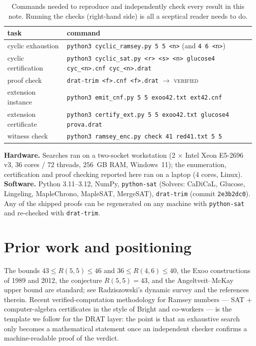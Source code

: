 \documentclass[11pt]{article}
\theoremstyle{definition}
\theoremstyle{plain}
\newcommand{\R}[2]{\ensuremath{R(#1,#2)}}
\begin{document}
\begin{table}[ht]
\centering\small
\begin{tabular}{ll}
\toprule
task & command \\
\midrule
cyclic exhaustion & \texttt{python3 cyclic\_ramsey.py 5 5 <n>} (and \texttt{4 6 <n>}) \\
cyclic certification & \texttt{python3 cyclic\_sat.py <r> <s> <n> glucose4 cyc\_<n>.cnf cyc\_<n>.drat} \\
proof check & \texttt{drat-trim <f>.cnf <f>.drat}  $\to$ \textsc{verified} \\
extension instance & \texttt{python3 emit\_cnf.py 5 5 exoo42.txt ext42.cnf} \\
extension certificate & \texttt{python3 certify\_ext.py 5 5 exoo42.txt glucose4 prova.drat} \\
witness check & \texttt{python3 ramsey\_enc.py check 41 red41.txt 5 5} \\
\bottomrule
\end{tabular}
\caption{Commands needed to reproduce and independently check every result in
this note. Running the checks (right-hand side) is all a sceptical reader
needs to do.}
\label{tab:cmd}
\end{table}

\textbf{Hardware.} Searches ran on a two-socket workstation (2 $\times$ Intel
Xeon E5-2696 v3, $36$ cores / $72$ threads, $256$~GB RAM, Windows~11); the
enumeration, certification and proof checking reported here ran on a laptop
(4 cores, Linux). \textbf{Software.} Python 3.11--3.12, NumPy, \texttt{python-sat}
(Solvers: CaDiCaL, Glucose, Lingeling, MapleChrono, MapleSAT, MergeSAT),
\texttt{drat-trim} (commit \texttt{2e3b2dc0}). Any of the shipped proofs can be
regenerated on any machine with \texttt{python-sat} and re-checked with
\texttt{drat-trim}.

\section{Prior work and positioning}\label{sec:prior}

The bounds $43 \le \R{5}{5} \le 46$ and $36 \le \R{4}{6} \le 40$, the Exoo
constructions of 1989 and 2012, the conjecture $\R{5}{5} = 43$, and the
Angeltveit--McKay upper bound are standard; see Radziszowski's dynamic survey
and the references therein. Recent verified-computation methodology for Ramsey
numbers --- SAT + computer-algebra certificates in the style of Bright and
co-workers --- is the template we follow for the DRAT layer: the point is that
an exhaustive search only becomes a mathematical statement once an independent
checker confirms a machine-readable proof of the verdict.
\end{document}
